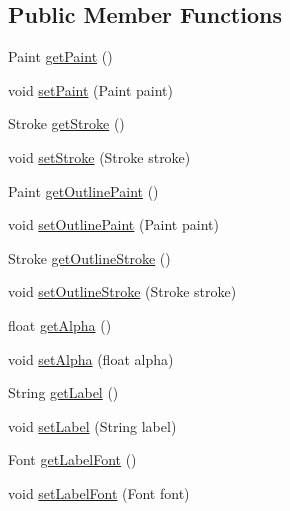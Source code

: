 \subsection*{Public Member Functions}
\begin{DoxyCompactItemize}
\item 
Paint \mbox{\hyperlink{classorg_1_1jfree_1_1chart_1_1plot_1_1_marker_a65f07e12154446a3f6883ee55da268fd}{get\+Paint}} ()
\item 
void \mbox{\hyperlink{classorg_1_1jfree_1_1chart_1_1plot_1_1_marker_a3c4514961bdf817e6d1ce39f67209dcf}{set\+Paint}} (Paint paint)
\item 
Stroke \mbox{\hyperlink{classorg_1_1jfree_1_1chart_1_1plot_1_1_marker_a43dd4fcef3afb93e3562988abb70d38b}{get\+Stroke}} ()
\item 
void \mbox{\hyperlink{classorg_1_1jfree_1_1chart_1_1plot_1_1_marker_a2bddd459ce4410c551943204d2be7dc0}{set\+Stroke}} (Stroke stroke)
\item 
Paint \mbox{\hyperlink{classorg_1_1jfree_1_1chart_1_1plot_1_1_marker_a36e985c2203c98a8da657b5bd1fd6c67}{get\+Outline\+Paint}} ()
\item 
void \mbox{\hyperlink{classorg_1_1jfree_1_1chart_1_1plot_1_1_marker_a1be6737e5fd64b728309cc4dcc08e9b3}{set\+Outline\+Paint}} (Paint paint)
\item 
Stroke \mbox{\hyperlink{classorg_1_1jfree_1_1chart_1_1plot_1_1_marker_abb7e4be1e8ebb8f8a7144217f8abd8d9}{get\+Outline\+Stroke}} ()
\item 
void \mbox{\hyperlink{classorg_1_1jfree_1_1chart_1_1plot_1_1_marker_a6b74fd1bc29c013360dff5775f1ef8f3}{set\+Outline\+Stroke}} (Stroke stroke)
\item 
float \mbox{\hyperlink{classorg_1_1jfree_1_1chart_1_1plot_1_1_marker_a922320b156d95ee82de7a831f03a520c}{get\+Alpha}} ()
\item 
void \mbox{\hyperlink{classorg_1_1jfree_1_1chart_1_1plot_1_1_marker_aa8bd3303290bf0be26e17c90794a434f}{set\+Alpha}} (float alpha)
\item 
String \mbox{\hyperlink{classorg_1_1jfree_1_1chart_1_1plot_1_1_marker_ade0e1e05ae18b887d6a4f3f50fdbdf74}{get\+Label}} ()
\item 
void \mbox{\hyperlink{classorg_1_1jfree_1_1chart_1_1plot_1_1_marker_a3e54b16046fd62f5c8bf9f2d5afee450}{set\+Label}} (String label)
\item 
Font \mbox{\hyperlink{classorg_1_1jfree_1_1chart_1_1plot_1_1_marker_a917624a7c9cd70529447d3db29ccb9cc}{get\+Label\+Font}} ()
\item 
void \mbox{\hyperlink{classorg_1_1jfree_1_1chart_1_1plot_1_1_marker_af5f77944a9b858bd7dc2da90287df3c6}{set\+Label\+Font}} (Font font)

\end{DoxyCompactItemize}
